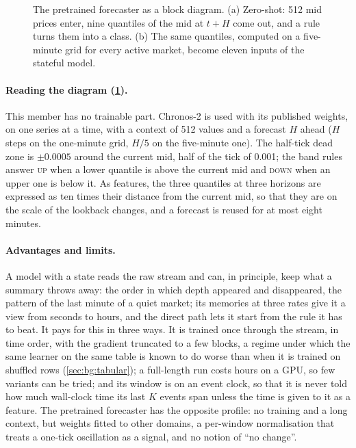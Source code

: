 \begin{figure}[t]
\centering
\resizebox{\textwidth}{!}{}
\caption{The pretrained forecaster as a block diagram.  (a) Zero-shot: 512 mid prices
enter, nine quantiles of the mid at $t+H$ come out, and a rule turns them into a class.
(b) The same quantiles, computed on a five-minute grid for every active market, become
eleven inputs of the stateful model.}
\label{fig:models:chronos}
\end{figure}

\paragraph{Reading the diagram (\cref{fig:models:chronos}).}  This member has no
trainable part.  Chronos-2 is used with its published weights, on one series at a time,
with a context of 512 values and a forecast $H$ ahead ($H$ steps on the one-minute grid,
$H / 5$ on the five-minute one).  The half-tick dead zone is
$\pm 0.0005$ around the current mid, half of the tick of 0.001; the band rules answer
\textsc{up} when a lower quantile is above the current mid and \textsc{down} when an
upper one is below it.  As features, the three quantiles at three horizons are expressed
as ten times their distance from the current mid, so that they are on the scale of the
lookback changes, and a forecast is reused for at most eight minutes.

\paragraph{Advantages and limits.}  A model with a state reads the raw stream and can, in
principle, keep what a summary throws away: the order in which depth appeared and
disappeared, the pattern of the last minute of a quiet market; its memories at three rates
give it a view from seconds to hours, and the direct path lets it start from the rule it
has to beat.  It pays for this in three ways.  It is trained once through the stream, in
time order, with the gradient truncated to a few blocks, a regime under which the same
learner on the same table is known to do worse than when it is trained on shuffled rows
(\cref{sec:bg:tabular}); a full-length run costs hours on a GPU, so few variants can be
tried; and its window is on an event clock, so that it is never told how much wall-clock
time its last $K$ events span unless the time is given to it as a feature.  The
pretrained forecaster has the opposite profile: no training and a long context, but
weights fitted to other domains, a per-window normalisation that treats a one-tick
oscillation as a signal, and no notion of ``no change''.

